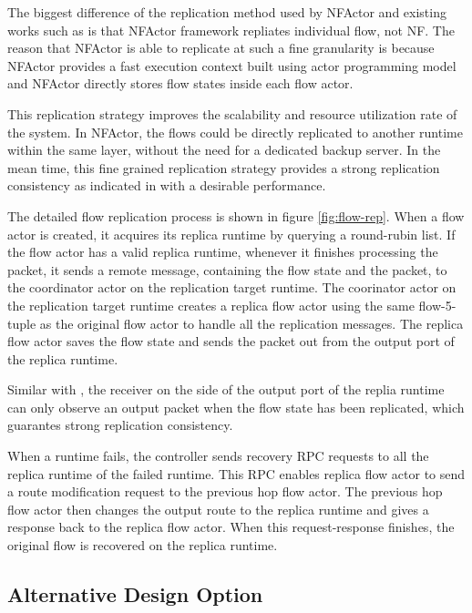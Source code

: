 The biggest difference of the replication method used by NFActor and existing works such as \cite{sherry2015rollback} is that NFActor framework repliates individual flow, not NF. The reason that NFActor is able to replicate at such a fine granularity is because NFActor provides a fast execution context built using actor programming model and NFActor directly stores flow states inside each flow actor.

This replication strategy improves the scalability and resource utilization rate of the system. In NFActor, the flows could be directly replicated to another runtime within the same layer, without the need for a dedicated backup server. In the mean time, this fine grained replication strategy provides a strong replication consistency as indicated in \cite{sherry2015rollback} with a desirable performance.

The detailed flow replication process is shown in figure \ref{fig:flow-rep}. When a flow actor is created, it acquires its replica runtime by querying a round-rubin list. If the flow actor has a valid replica runtime, whenever it finishes processing the packet, it sends a remote message, containing the flow state and the packet, to the coordinator actor on the replication target runtime. The coorinator actor on the replication target runtime creates a replica flow actor using the same flow-5-tuple as the original flow actor to handle all the replication messages. The replica flow actor saves the flow state and sends the packet out from the output port of the replica runtime.

Similar with \cite{sherry2015rollback}, the receiver on the side of the output port of the replia runtime can only observe an output packet when the flow state has been replicated, which guarantes strong replication consistency.

When a runtime fails, the controller sends recovery RPC requests to all the replica runtime of the failed runtime. This RPC enables replica flow actor to send a route modification request to the previous hop flow actor. The previous hop flow actor then changes the output route to the replica runtime and gives a response back to the replica flow actor. When this request-response finishes, the original flow is recovered on the replica runtime.

\subsection{Alternative Design Option}

